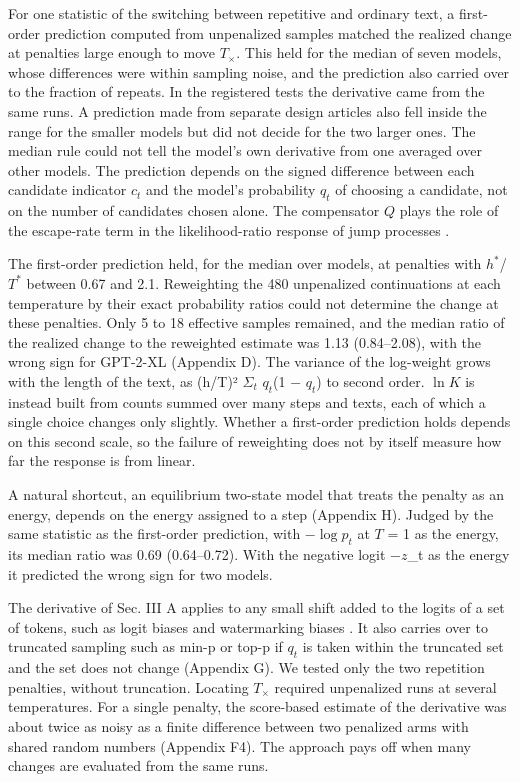 \documentclass[aps,prx,onecolumn,superscriptaddress,longbibliography]{revtex4-2}
\begin{document}
For one statistic of the switching between repetitive and ordinary text, a first-order prediction computed from unpenalized samples matched the realized change at penalties large enough to move \(T_{\times}\). This held for the median of seven models, whose differences were within sampling noise, and the prediction also carried over to the fraction of repeats. In the registered tests the derivative came from the same runs. A prediction made from separate design articles also fell inside the range for the smaller models but did not decide for the two larger ones. The median rule could not tell the model's own derivative from one averaged over other models. The prediction depends on the signed difference between each candidate indicator \(c_{t}\) and the model's probability \(q_{t}\) of choosing a candidate, not on the number of candidates chosen alone. The compensator \(Q\) plays the role of the escape-rate term in the likelihood-ratio response of jump processes \cite{0902.3955,2005.10503}.

The first-order prediction held, for the median over models, at penalties with \textbar{}\(h^*\)\textbar/\(T^*\) between 0.67 and 2.1. Reweighting the 480 unpenalized continuations at each temperature by their exact probability ratios could not determine the change at these penalties. Only 5 to 18 effective samples remained, and the median ratio of the realized change to the reweighted estimate was 1.13 (0.84--2.08), with the wrong sign for GPT-2-XL (Appendix D). The variance of the log-weight grows with the length of the text, as (h/T)² \(\Sigma_{t}\) \(q_{t}\)(1 − \(q_{t}\)) to second order. \(\ln K\) is instead built from counts summed over many steps and texts, each of which a single choice changes only slightly. Whether a first-order prediction holds depends on this second scale, so the failure of reweighting does not by itself measure how far the response is from linear.

A natural shortcut, an equilibrium two-state model that treats the penalty as an energy, depends on the energy assigned to a step (Appendix H). Judged by the same statistic as the first-order prediction, with \(-\log p_t\) at \(T\) = 1 as the energy, its median ratio was 0.69 (0.64--0.72). With the negative logit \(-z\)\_t as the energy it predicted the wrong sign for two models.

The derivative of Sec. III A applies to any small shift added to the logits of a set of tokens, such as logit biases and watermarking biases \cite{2301.10226}. It also carries over to truncated sampling such as min-p \cite{2407.01082} or top-p \cite{1904.09751} if \(q_{t}\) is taken within the truncated set and the set does not change (Appendix G). We tested only the two repetition penalties, without truncation. Locating \(T_{\times}\) required unpenalized runs at several temperatures. For a single penalty, the score-based estimate of the derivative was about twice as noisy as a finite difference between two penalized arms with shared random numbers (Appendix F4). The approach pays off when many changes are evaluated from the same runs.
\end{document}
